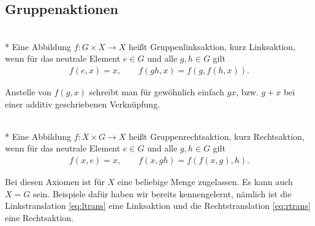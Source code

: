 \subsection{Gruppenaktionen}

\begin{Definition}[Linksaktion]\mbox{}\\*
Eine Abbildung $f\colon G\times X\to X$ heißt Gruppenlinksaktion,
kurz Linksaktion, wenn für das neutrale Element $e\in G$ und alle
$g,h\in G$ gilt
\begin{gather*}
f(e,x) = x,\qquad f(gh,x) = f(g,f(h,x)).
\end{gather*}
\end{Definition}
Anstelle von $f(g,x)$ schreibt man für gewöhnlich einfach $gx$,
bzw. $g+x$ bei einer additiv geschriebenen Verknüpfung.

\begin{Definition}[Rechtsaktion]\mbox{}\\*
Eine Abbildung $f\colon X\times G\to X$ heißt Gruppenrechtsaktion,
kurz Rechtsaktion, wenn für das neutrale Element $e\in G$ und
alle $g,h\in G$ gilt
\begin{gather*}
f(x,e) = x,\qquad f(x,gh) = f(f(x,g),h).
\end{gather*}
\end{Definition}
Bei diesen Axiomen ist für $X$ eine beliebige Menge zugelassen.
Es kann auch $X=G$ sein. Beispiele dafür haben wir bereits
kennengelernt, nämlich ist die Linkstranslation \eqref{eq:ltrans} eine
Linksaktion und die Rechtstranslation \eqref{eq:rtrans} eine
Rechtsaktion.

